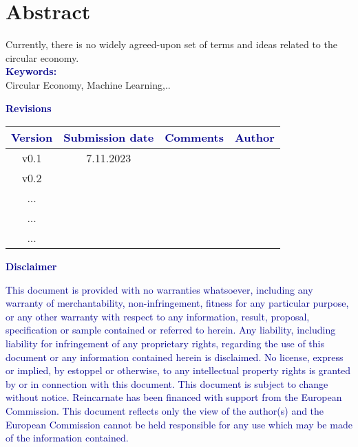 \section*{Abstract}
Currently, there is no widely agreed-upon set of terms and ideas related to the circular economy. \\
\textcolor{darkblue}{\textbf{Keywords:\\}}
Circular Economy, Machine Learning,..
\begin{center}
    \textcolor{darkblue}{\textbf{Revisions}}
\begin{table}[h]
\centering
\renewcommand{\arraystretch}{1.3}
\begin{tabularx}{\textwidth}{|C|C|C|C|}
\hline
\textcolor{darkblue}{\textbf{Version}} & \textcolor{darkblue}{\textbf{Submission date}} & \textcolor{darkblue}{\textbf{Comments}} & \textcolor{darkblue}{\textbf{Author}}\\ \hline
v0.1 & 7.11.2023 & & \\ \hline
v0.2 &  & &  \\ \hline
... &  & &  \\ \hline
... & &  &  \\ \hline
... & & &  \\ \hline
\end{tabularx}
\end{table}
\end{center}
\begin{center}
    \textcolor{darkblue}{\textbf{Disclaimer}}
\end{center}

\begin{tcolorbox}[width=0.99\textwidth, colframe=black, colback=white]
\textcolor{darkblue}{
This document is provided with no warranties whatsoever, including any warranty of merchantability, non-infringement, fitness for any particular purpose, or any other warranty with respect to any information, result, proposal, specification or sample contained or referred to herein. Any liability, including liability for infringement of any proprietary rights, regarding the use of this document or any information contained herein is disclaimed. No license, express or implied, by estoppel or otherwise, to any intellectual property rights is granted by or in connection with this document. This document is subject to change without notice. Reincarnate has been financed with support from the European Commission. This document reflects only the view of the author(s) and the European Commission cannot be held responsible for any use which may be made of the information contained.
}
\end{tcolorbox}
